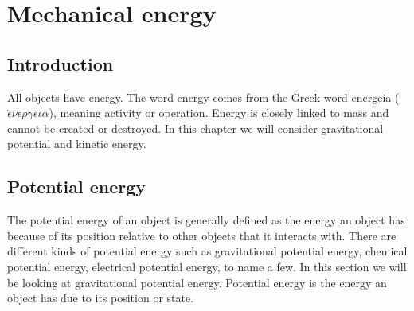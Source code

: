          \chapter{Mechanical energy} \label{chap:energy}
    \setcounter{figure}{1}
    \setcounter{subfigure}{1}
    \label{1fc5ba69690764517c30802fdf7b1905}
         \section{Introduction}
    \nopagebreak
            \label{m38784*id7521}All objects have energy. The word energy comes from the Greek word energeia ($\acute{\epsilon} \nu \acute{\epsilon} \rho \gamma \epsilon \iota \alpha $), meaning activity or operation. Energy is closely linked to mass and cannot be created or destroyed. In this chapter we will consider gravitational potential and kinetic energy. 
\par \label{m38784*cid4}
            \section{Potential energy}
            \nopagebreak
      \label{m38784*id66142}The potential energy of an object is generally defined as the energy an object has because of its position relative to other objects that it interacts with. There are different kinds of potential energy such as gravitational potential energy, chemical potential energy, electrical potential energy, to name a few. In this section we will be looking at gravitational potential energy.
 { Potential energy is the energy an object has due to its position or state. } 


